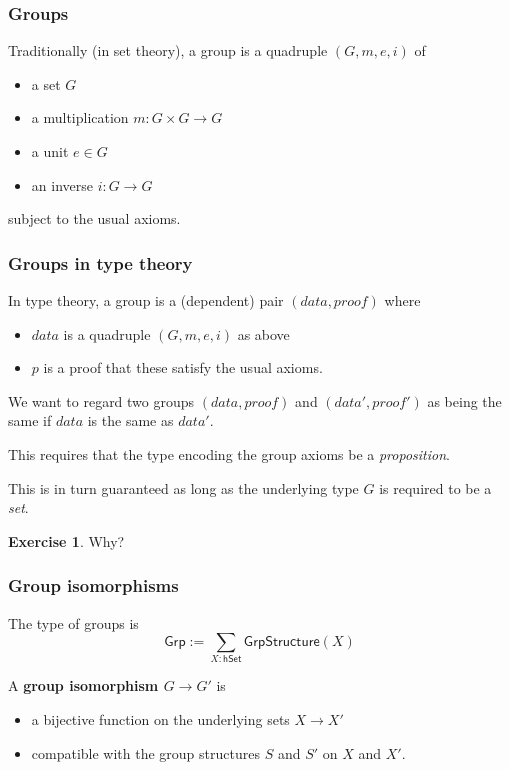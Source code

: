 \documentclass{beamer}
\newcommand{\fat}[1]{\textbf{#1}}
\newcommand{\constfont}[1]{\ensuremath{\mathsf{#1}}}
\newcommand{\Grp}{\constfont{Grp}}
\newcommand{\GrpStructure}{\constfont{GrpStructure}}
\newcommand{\hSet}{\constfont{hSet}}
\theoremstyle{definition}
\newtheorem{exercise}{Exercise}
\begin{document}
\begin{frame}
 \frametitle{Groups}

    Traditionally (in set theory), a group is a quadruple $(G,m, e, i)$ of
      \begin{itemize}
       \item a set $G$
       \item a multiplication $m : G\times G \to G$
       \item a unit $e \in G$
       \item an inverse $i : G \to G$
      \end{itemize}
     subject to the usual axioms.

\end{frame}

\begin{frame}
 \frametitle{Groups in type theory}

    In type theory, a group is a (dependent) pair $(data, proof)$ where
      \begin{itemize}
       \item $data$ is a quadruple $(G,m,e,i)$ as above
       \item $p$ is a proof that these satisfy the usual axioms.
      \end{itemize}

      \pause
      We want to regard two groups $(data, proof)$ and $(data', proof')$ as being the same if $data$ is the same as $data'$.

      \pause
      This requires that the type encoding the group axioms be a \emph{proposition}.

      \pause
      This is in turn guaranteed as long as the underlying type $G$ is required to be a \emph{set}.

      \begin{exercise}
        Why?
      \end{exercise}
\end{frame}

\begin{frame}
  \frametitle{Group isomorphisms}

  The type of groups is
  \[ \Grp := \sum_{X : \hSet}\GrpStructure(X) \]

  \begin{block}{A \fat{group isomorphism $G \to G'$} is }
    \begin{itemize}
    \item a bijective function on the underlying sets $X \to X'$
    \item compatible with the group structures $S$ and $S'$ on $X$ and $X'$.
    \end{itemize}
  \end{block}

\end{frame}
\end{document}
